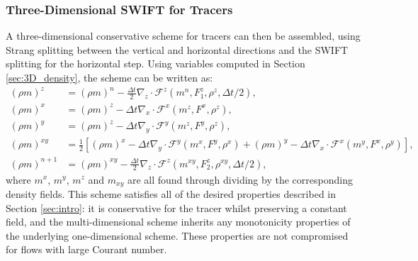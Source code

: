 \documentclass[11pt,a4paper]{article}
\begin{document}
\subsubsection{Three-Dimensional SWIFT for Tracers}
A three-dimensional conservative scheme for tracers can then be assembled, using Strang splitting between the vertical and horizontal directions and the SWIFT splitting for the horizontal step.
Using variables computed in Section \ref{sec:3D_density}, the scheme can be written as:
\begin{subequations}
\begin{align}
(\rho m)^z & = (\rho m)^n - \tfrac{\Delta t}{2}\nabla_z \cdot \mathcal{F}^z\left(m^n, F^z_1, \rho^z, \Delta t /2 \right), \\
(\rho m)^x & = (\rho m)^z - \Delta t \nabla_x \cdot \mathcal{F}^x\left(m^z, F^x, \rho^z \right), \\
(\rho m)^y & = (\rho m)^z - \Delta t \nabla_y \cdot \mathcal{F}^y\left(m^z, F^y, \rho^z \right), \\
(\rho m)^{xy} & = \frac{1}{2}\left[(\rho m)^x - \Delta t \nabla_y \cdot \mathcal{F}^y\left(m^x, F^y, \rho^x \right) + (\rho m)^y - \Delta t \nabla_x \cdot \mathcal{F}^x\left(m^y, F^x,\rho^y\right)\right], \\
(\rho m)^{n+1} & = (\rho m)^{xy} - \tfrac{\Delta t}{2}\nabla_z\cdot\mathcal{F}^z\left(m^{xy},F_2^z,\rho^{xy},\Delta t/2\right),
\end{align}
\end{subequations}
where $m^x$, $m^y$, $m^z$ and $m_{xy}$ are all found through dividing by the corresponding density fields.
This scheme satisfies all of the desired properties described in Section \ref{sec:intro}: it is conservative for the tracer whilst preserving a constant field, and the multi-dimensional scheme inherits any monotonicity properties of the underlying one-dimensional scheme.
These properties are not compromised for flows with large Courant number.
\end{document}
